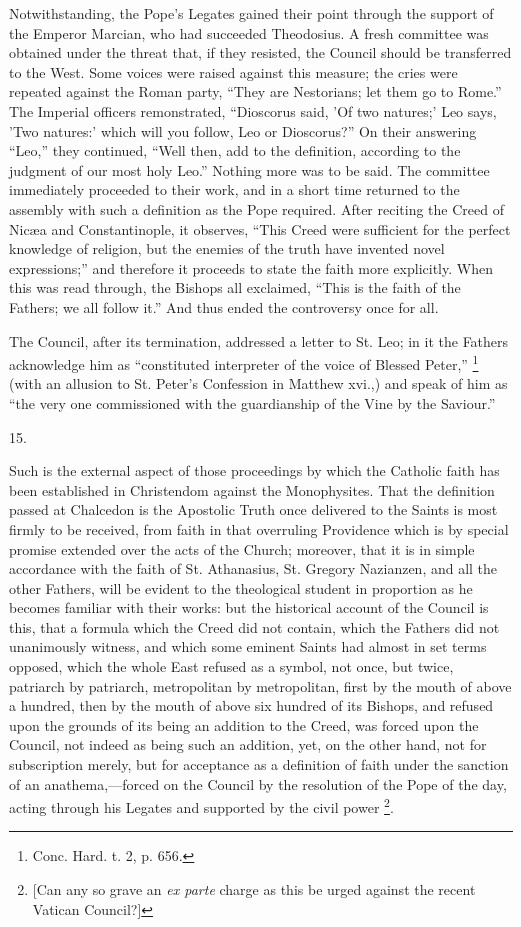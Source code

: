 Notwithstanding, the Pope's Legates gained their point through the
support of the Emperor Marcian, who had succeeded Theodosius. A fresh
committee was obtained under the threat that, if they resisted, the
Council should be transferred to the West. Some voices were raised
against this measure; the cries were repeated against the Roman party,
``They are Nestorians; let them go to Rome.'' The Imperial
officers remonstrated, ``Dioscorus said, 'Of two natures;' Leo
says, 'Two natures:' which will you follow, Leo or Dioscorus?'' On
their answering ``Leo,'' they continued, ``Well then, add
to the definition, according to the judgment of our most holy
Leo.'' Nothing more was to be said. The committee immediately
proceeded to their work, and in a short time returned to the assembly
with such a definition as the Pope required. After reciting the Creed
of Nicæa and Constantinople, it observes, ``This Creed were
sufficient for the perfect knowledge of religion, but the enemies of
the truth have invented novel expressions;'' and therefore it
proceeds to state the faith more explicitly. When this was read
through, the Bishops all exclaimed, ``This is the faith of the
Fathers; we all follow it.'' And thus ended the controversy once
for all.

The Council, after its termination, addressed a letter to St. Leo;
in it the Fathers acknowledge him as ``constituted interpreter of
the voice of Blessed Peter,'' \footnote{Conc. Hard. t. 2, p. 656.} (with an allusion to St. Peter's Confession in Matthew xvi.,)
and speak of him as ``the very one commissioned with the
guardianship of the Vine by the Saviour.''

15.

Such is the external aspect of those proceedings by which the
Catholic faith has been established in Christendom against the
Monophysites. That the definition passed at Chalcedon is the Apostolic
Truth once delivered to the Saints is most firmly to be received, from
faith in that overruling Providence which is by special promise
extended over the acts of the Church; moreover, that it is in simple
accordance with the faith of St. Athanasius, St. Gregory Nazianzen,
and all the other Fathers, will be evident to the theological student
in proportion as he becomes familiar with their works: but the
historical account of the Council is this, that a formula which the
Creed did not contain, which the Fathers did not unanimously witness,
and which some eminent Saints had almost in set terms opposed, which
the whole East refused as a symbol, not once, but twice, patriarch by
patriarch, metropolitan by metropolitan, first by the mouth of above a
hundred, then by the mouth of above six hundred of its Bishops, and
refused upon the grounds of its being an addition to the Creed, was
forced upon the Council, not indeed as being such an addition, yet, on
the other hand, not for subscription merely, but for acceptance as a
definition of faith under the sanction of an anathema,—forced on the
Council by the resolution of the Pope of the day, acting through his
Legates and supported by the civil power \footnote{[Can any so grave an \emph{ex parte}
charge as this be urged against the recent Vatican Council?]}.

